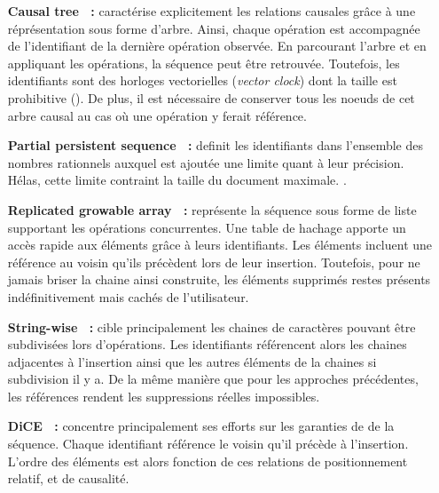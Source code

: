 \begin{itemize}
\item [\textbf{Causal tree~\cite{grishchenko2010deep} :}] caractérise
  explicitement les relations causales grâce à une réprésentation sous forme
  d'arbre. Ainsi, chaque opération est accompagnée de l'identifiant de la
  dernière opération observée. En parcourant l'arbre et en appliquant les
  opérations, la séquence peut être retrouvée. Toutefois, les identifiants sont
  des horloges vectorielles (\emph{vector clock}) dont la taille est prohibitive
  (\REF). De plus, il est nécessaire de conserver tous les noeuds de cet arbre
  causal au cas où une opération y ferait référence.
\item [\textbf{Partial persistent sequence~\cite{wu2010partial} :}] definit les
  identifiants dans l'ensemble des nombres rationnels auxquel est ajoutée une
  limite quant à leur précision. Hélas, cette limite contraint la taille du
  document maximale. . 
\item [\textbf{Replicated growable array~\cite{roh2011replicated} :}] représente
  la séquence sous forme de liste supportant les opérations concurrentes. Une
  table de hachage apporte un accès rapide aux éléments grâce à leurs
  identifiants. Les éléments incluent une référence au voisin qu'ils précèdent
  lors de leur insertion. Toutefois, pour ne jamais briser la chaine ainsi
  construite, les éléments supprimés restes présents indéfinitivement mais
  cachés de l'utilisateur. 
\item [\textbf{String-wise~\cite{yu2012stringwise} :}] cible principalement les
  chaines de caractères pouvant être subdivisées lors d'opérations. Les
  identifiants référencent alors les chaines adjacentes à l'insertion ainsi que
  les autres éléments de la chaines si subdivision il y a. De la même manière
  que pour les approches précédentes, les références rendent les suppressions
  réelles impossibles.
\item [\textbf{DiCE~\cite{conway2014language} :}] concentre principalement ses
  efforts sur les garanties de  de la séquence. Chaque
  identifiant référence le voisin qu'il précède à l'insertion. L'ordre des
  éléments est alors fonction de ces relations de positionnement relatif, et de
  causalité.
\end{itemize}

